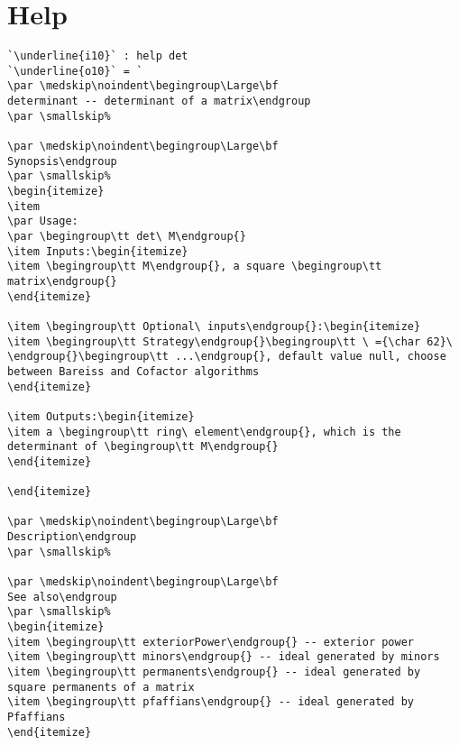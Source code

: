 \documentclass[12pt,a4paper]{amsart}
\begin{document}
\section{Help}
\begin{lstlisting}[language=Macaulay2]
`\underline{i10}` : help det
`\underline{o10}` = `
\par \medskip\noindent\begingroup\Large\bf
determinant -- determinant of a matrix\endgroup
\par \smallskip%

\par \medskip\noindent\begingroup\Large\bf
Synopsis\endgroup
\par \smallskip%
\begin{itemize}
\item 
\par Usage: 
\par \begingroup\tt det\ M\endgroup{}
\item Inputs:\begin{itemize}
\item \begingroup\tt M\endgroup{}, a square \begingroup\tt matrix\endgroup{}
\end{itemize}

\item \begingroup\tt Optional\ inputs\endgroup{}:\begin{itemize}
\item \begingroup\tt Strategy\endgroup{}\begingroup\tt \ ={\char 62}\ \endgroup{}\begingroup\tt ...\endgroup{}, default value null, choose between Bareiss and Cofactor algorithms
\end{itemize}

\item Outputs:\begin{itemize}
\item a \begingroup\tt ring\ element\endgroup{}, which is the determinant of \begingroup\tt M\endgroup{}
\end{itemize}

\end{itemize}

\par \medskip\noindent\begingroup\Large\bf
Description\endgroup
\par \smallskip%

\par \medskip\noindent\begingroup\Large\bf
See also\endgroup
\par \smallskip%
\begin{itemize}
\item \begingroup\tt exteriorPower\endgroup{} -- exterior power
\item \begingroup\tt minors\endgroup{} -- ideal generated by minors
\item \begingroup\tt permanents\endgroup{} -- ideal generated by square permanents of a matrix
\item \begingroup\tt pfaffians\endgroup{} -- ideal generated by Pfaffians
\end{itemize}


\end{lstlisting}
\end{document}
